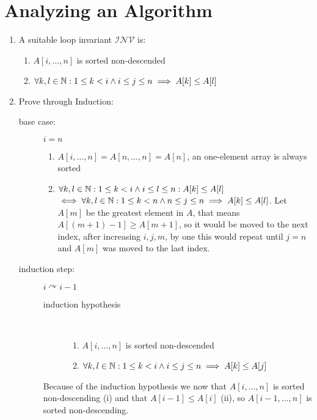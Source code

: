 \documentclass[sectionformat = exercise]{gadsescript}
\begin{document}
\maketitle
\section{Analyzing an Algorithm}
\begin{enumerate}[label=\alph*)]
	\item A suitable loop invariant $ \mathcal{INV}  $ is: 
		\begin{enumerate}[label=(\roman*)]
			\item $ A[i, \dotsc, n] $ is sorted non-descended
			\item $ \forall k,l \in \mathbb{N} : 1 \leq k < i \wedge i \leq j \leq n \implies A[k] \leq A[l] $
		\end{enumerate}
	\item Prove through Induction:
		\begin{description}
			\item[base case:] $ i = n $
				\begin{enumerate}[label=(\roman*)]
					\item $ A[i, \dotsc, n] = A[n, \dotsc, n] = A[n] $, an one-element array is always sorted
					\item $ \forall k,l \in \mathbb{N} : 1 \leq k < i \wedge i \leq  l \leq n: A[k] \leq A[l] $\\
						$ \iff \forall k, l \in \mathbb{N} : 1 \leq k < n \wedge n \leq  j \leq n \implies A[k] \leq A[l] $. Let $ A[m] $ be the greatest element in $ A $, that means $ A[(m+1)-1] \geq A[m + 1] $, so it would be moved to the next index, after increasing $ i, j, m $, by one this would repeat until $ j=n $ and $ A[m] $ was moved to the last index.
				\end{enumerate}
			\item[induction step:] $ i \curvearrowright i - 1 $
				\begin{description}
					\item[induction hypothesis] ~
						\begin{enumerate}[label=(\roman*)]
							\item $ A[i, \dotsc, n] $ is sorted non-descended
							\item $ \forall k,l \in \mathbb{N} : 1 \leq k < i \wedge i \leq  j \leq n \implies A[k] \leq A[j] $
						\end{enumerate}
				\end{description}
				Because of the induction hypothesis we now that $ A[i, \dotsc, n] $ is sorted non-descending (i) and that $ A[i - 1] \leq A[i] $ (ii), so $ A[i-1, \dotsc, n] $ is sorted non-descending.

\end{description}
\end{enumerate}
\end{document}
